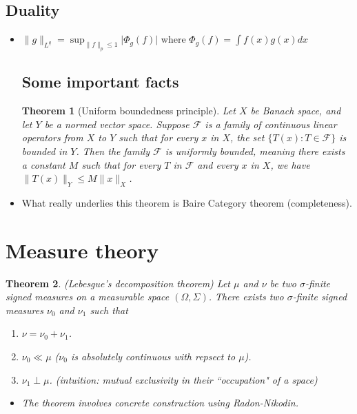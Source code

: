 \documentclass[11pt,reqno]{amsart}
\newtheorem{theorem}{Theorem}
\theoremstyle{remark}
\begin{document}
\subsection{Duality}
\begin{itemize}
\item $\lVert g\rVert_{L^q}=\sup_{\lVert f\rVert_p\leq 1}\lvert\Phi_g(f)\rvert$ where $\Phi_g(f)=\int f(x)g(x)dx$
\subsection{Some important facts}
\begin{theorem}[Uniform boundedness principle]
  Let $X$ be Banach space, and let $Y$ be a normed vector space. Suppose 
  $\mathcal{F}$ is a family of continuous linear operators from $X$ to $Y$ such 
  that for every $x$ in $X$, the set $\{T(x):T\in \mathcal{F}\}$ is bounded in $Y$.
   Then the family $\mathcal{F}$ is uniformly bounded, meaning there exists a constant $M$ such that
    for every $T$ in $\mathcal{F}$ and every $x$ in $X$, we have $\lVert T(x)\rVert_Y\leq M\lVert x\rVert_X$.
  \end{theorem}
\item What really underlies this theorem is Baire Category theorem (completeness).
\end{itemize}

\section{Measure theory}
\begin{theorem} (Lebesgue's decomposition theorem)
Let $\mu$ and $\nu$ be two $\sigma$-finite signed measures on a measurable space $(\Omega,\Sigma)$. There exists 
two $\sigma$-finite signed measures $\nu_0$ and $\nu_1$ such that
\begin{enumerate}
\item $\nu = \nu_0 + \nu_1$.
\item $\nu_0 \ll \mu$ ($\nu_0$ is absolutely continuous with repsect to $\mu$).
\item $\nu_1 \perp \mu$. (intuition: mutual exclusivity in their ``occupation" of a space)
\end{enumerate}
\begin{itemize}
\item The theorem involves concrete construction using Radon-Nikodin.
\end{itemize}
\end{theorem}
\end{document}
